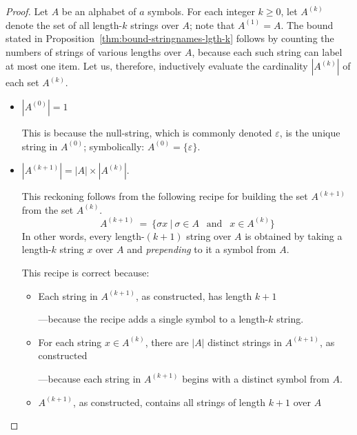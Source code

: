 \begin{proof}
Let $A$ be an alphabet of $a$ symbols.  For each integer $k \geq 0$, let $A^{(k)}$ denote the set of all length-$k$ strings over $A$; note that $A^{(1)} = A$.  The bound stated in Proposition~\ref{thm:bound-stringnames-lgth-k} follows by counting the numbers of strings of various lengths over $A$, because each such string can label at most one item.  Let us, therefore, inductively evaluate the cardinality $|A^{(k)}|$ of each set $A^{(k)}$.
\begin{itemize}
\item
$|A^{(0)}| =1$

\smallskip

This is because the null-string, which is commonly denoted $\varepsilon$,  is the unique string in $A^{(0)}$; symbolically: $A^{(0)} = \{ \varepsilon \}$.

\item
$|A^{(k+1)}| = |A| \times |A^{(k)}|$.

\smallskip

This reckoning follows from the following recipe for building the set $A^{(k+1)}$ from the set $A^{(k)}$.
\[
A^{(k+1)} \ = \ \{ \sigma x \ | \ \sigma \in A \ \ \mbox{ and } \ \ x \in A^{(k)} \}
\]
In other words, every length-$(k+1)$ string over $A$ is obtained by taking a length-$k$ string $x$ over $A$ and {\em prepending} to it a symbol from $A$.

\smallskip

This recipe is correct because:
  \begin{itemize}
  \item
Each string in $A^{(k+1)}$, as constructed, has length $k+1$

\smallskip

---because the recipe adds a single symbol to a length-$k$ string.
  \item
For each string $x \in A^{(k)}$, there are $|A|$ distinct strings in $A^{(k+1)}$, as constructed

\smallskip

---because each string in $A^{(k+1)}$ begins with a distinct symbol from $A$.

  \item
$A^{(k+1)}$, as constructed, contains all strings of length $k+1$ over $A$

\smallskip


\end{itemize}
\end{itemize}
\end{proof}
